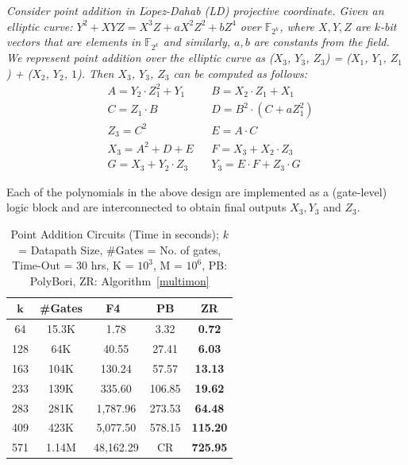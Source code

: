 \begin{Example}
{\it Consider point addition in L$\acute{o}$pez-Dahab (LD) projective coordinate. Given an elliptic curve: $Y^2 + XYZ = X^3Z + aX^2Z^2 + bZ^4$ over $\mathbb{F}_{2^k}$, where $X,Y,Z$ are $k$-bit vectors that are elements in $\mathbb{F}_{2^k}$ and similarly, $a, b$ are constants from the field. We represent point addition over the elliptic curve as ($X_3$, $Y_3$, $Z_3$) = ($X_1$, $Y_1$, $Z_1$) + ($X_2$, $Y_2$, $1$).  Then $X_3$, $Y_3$, $Z_3$ can be computed as follows:} 
\begin{align*}
&A = Y_2 \cdot Z_1^2 + Y_1  &&B = X_2 \cdot Z_1 + X_1 \\
&C = Z_1 \cdot B  &&D = B^2 \cdot(C + a Z_1^2) \\
&Z_3 = C^2 && E = A \cdot C  \\
&X_3 = A^2 + D + E &&F = X_3 + X_2 \cdot Z_3 \\
&G = X_3 + Y_2\cdot Z_3 && Y_3 = E\cdot F + Z_3 \cdot G
\end{align*}
\end{Example}
Each of the polynomials in the above design are implemented as a
(gate-level) logic block and are interconnected to obtain final
outputs $X_3,Y_3$ and $Z_3$. 

\begin{table}[ht]
\centering
\caption{Point Addition Circuits (Time in seconds); $k$ = Datapath Size, \#Gates = No. of gates, Time-Out = 30 hrs, K = $10^3$, M = $10^6$,
PB: PolyBori, ZR: Algorithm~\ref{multimon}}
\label{pointadd}
\begin{tabular}{| c | c || c | c | c |} \hline
$\boldsymbol{k}$&\textbf{\#Gates}&\textbf{F4~\cite{pruss:tcad}}&\textbf{PB}&\textbf{ZR} \\ \hline
64&15.3K&1.78&3.32&\textbf{0.72} \\ \hline
128&64K&40.55&27.41&\textbf{6.03} \\ \hline
163&104K&130.24&57.57&\textbf{13.13} \\ \hline
233&139K&335.60&106.85&\textbf{19.62} \\ \hline
283&281K&1,787.96&273.53& \textbf{64.48}\\ \hline
409&423K&5,077.50&578.15& \textbf{115.20}\\ \hline
571&1.14M&48,162.29&CR&\textbf{725.95} \\ \hline
\end{tabular}
\end{table}

